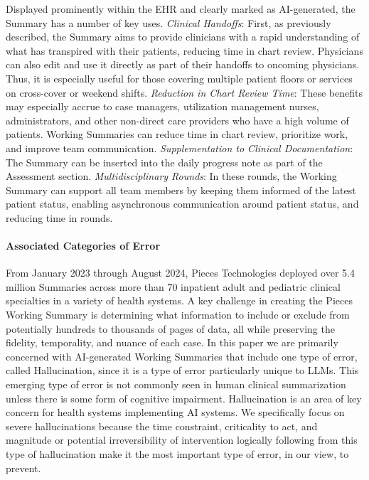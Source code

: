 \documentclass{style/myclass}
\begin{document}
Displayed prominently within the EHR and clearly marked as AI-generated, the Summary has a number of key uses. \textit{Clinical Handoffs}: First, as previously described, the Summary aims to provide clinicians with a rapid understanding of what has transpired with their patients, reducing time in chart review. Physicians can also edit and use it directly as part of their handoffs to oncoming physicians. Thus, it is especially useful for those covering multiple patient floors or services on cross-cover or weekend shifts. \textit{Reduction in Chart Review Time}: These benefits may especially accrue to case managers, utilization management nurses, administrators, and other non-direct care providers who have a high volume of patients. Working Summaries can reduce time in chart review, prioritize work, and improve team communication. \textit{Supplementation to Clinical Documentation}: The Summary can be inserted into the daily progress note as part of the Assessment section. \textit{Multidisciplinary Rounds}: In these rounds, the Working Summary can support all team members by keeping them informed of the latest patient status, enabling asynchronous communication around patient status, and reducing time in rounds.

\paragraph{Associated Categories of Error}

From January 2023 through August 2024, Pieces Technologies deployed over 5.4 million Summaries across more than 70 inpatient adult and pediatric clinical specialties in a variety of health systems. A key challenge in creating the Pieces Working Summary is determining what information to include or exclude from potentially hundreds to thousands of pages of data, all while preserving the fidelity, temporality, and nuance of each case. In this paper we are primarily concerned with AI-generated Working Summaries that include one type of error, called Hallucination, since it is a type of error particularly unique to LLMs. This emerging type of error is not commonly seen in human clinical summarization unless there is some form of cognitive impairment. Hallucination is an area of key concern for health systems implementing AI systems. \cite{4} We specifically focus on severe hallucinations because the time constraint, criticality to act, and magnitude or potential irreversibility of intervention logically following from this type of hallucination make it the most important type of error, in our view, to prevent.
\end{document}
